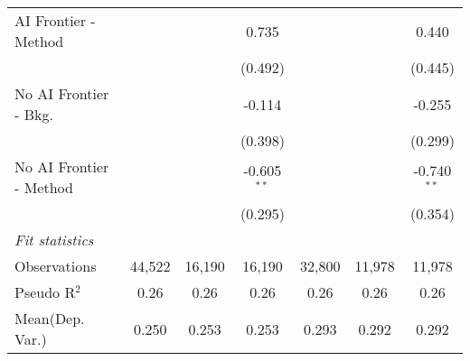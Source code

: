 \begin{tabular}{lcccccc}
   AI Frontier - Method    &               &                & 0.735         &               &                & 0.440\\   
                           &               &                & (0.492)       &               &                & (0.445)\\   
   No AI Frontier - Bkg.   &               &                & -0.114        &               &                & -0.255\\   
                           &               &                & (0.398)       &               &                & (0.299)\\   
   No AI Frontier - Method &               &                & -0.605$^{**}$ &               &                & -0.740$^{**}$\\   
                           &               &                & (0.295)       &               &                & (0.354)\\   
   \midrule
   \emph{Fit statistics}\\
   Observations            & 44,522        & 16,190         & 16,190        & 32,800        & 11,978         & 11,978\\  
   Pseudo R$^2$            & 0.26          & 0.26           & 0.26          & 0.26          & 0.26           & 0.26\\  
Mean(Dep. Var.) & 0.250 & 0.253 & 0.253 & 0.293 & 0.292 & 0.292 \\
   

\end{tabular}
